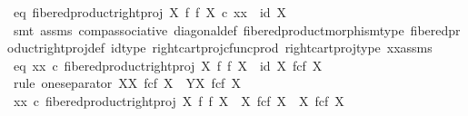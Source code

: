 \begin{isabellebody}
\ eq{}{\isacharcolon}{\kern0pt}\ {\isachardoublequoteopen}fibered{\isacharunderscore}{\kern0pt}product{\isacharunderscore}{\kern0pt}right{\isacharunderscore}{\kern0pt}proj\ X\ f\ f\ X\ {\isasymcirc}\isactrlsub c\ xx\ {\isacharequal}{\kern0pt}\ id\ X{\isachardoublequoteclose}\isanewline
\ \ \ \ \isamarkupfalse%
\ {\isacharparenleft}{\kern0pt}smt\ assms{\isacharparenleft}{\kern0pt}{}{\isacharparenright}{\kern0pt}\ comp{\isacharunderscore}{\kern0pt}associative{}\ diagonal{\isacharunderscore}{\kern0pt}def\ fibered{\isacharunderscore}{\kern0pt}product{\isacharunderscore}{\kern0pt}morphism{\isacharunderscore}{\kern0pt}type\ fibered{\isacharunderscore}{\kern0pt}product{\isacharunderscore}{\kern0pt}right{\isacharunderscore}{\kern0pt}proj{\isacharunderscore}{\kern0pt}def\ id{\isacharunderscore}{\kern0pt}type\ right{\isacharunderscore}{\kern0pt}cart{\isacharunderscore}{\kern0pt}proj{\isacharunderscore}{\kern0pt}cfunc{\isacharunderscore}{\kern0pt}prod\ right{\isacharunderscore}{\kern0pt}cart{\isacharunderscore}{\kern0pt}proj{\isacharunderscore}{\kern0pt}type\ xx{\isacharunderscore}{\kern0pt}assms{\isacharparenright}{\kern0pt}\isanewline
\isanewline
\ \ \isamarkupfalse%
\ eq{}{\isacharcolon}{\kern0pt}\ {\isachardoublequoteopen}xx\ {\isasymcirc}\isactrlsub c\ fibered{\isacharunderscore}{\kern0pt}product{\isacharunderscore}{\kern0pt}right{\isacharunderscore}{\kern0pt}proj\ X\ f\ f\ X\ {\isacharequal}{\kern0pt}\ id\ {\isacharparenleft}{\kern0pt}X\ \isactrlbsub f\isactrlesub {\isasymtimes}\isactrlsub c\isactrlbsub f\isactrlesub \ X{\isacharparenright}{\kern0pt}{\isachardoublequoteclose}\isanewline
\ \ \isamarkupfalse%
\ {\isacharparenleft}{\kern0pt}rule\ one{\isacharunderscore}{\kern0pt}separator{\isacharbrackleft}{\kern0pt}\ X{\isacharequal}{\kern0pt}{\isachardoublequoteopen}X\ \isactrlbsub f\isactrlesub {\isasymtimes}\isactrlsub c\isactrlbsub f\isactrlesub \ X{\isachardoublequoteclose}{\isacharcomma}{\kern0pt}\ \ Y{\isacharequal}{\kern0pt}{\isachardoublequoteopen}X\ \isactrlbsub f\isactrlesub {\isasymtimes}\isactrlsub c\isactrlbsub f\isactrlesub \ X{\isachardoublequoteclose}{\isacharbrackright}{\kern0pt}{\isacharparenright}{\kern0pt}\isanewline
\ \ \ \ \isamarkupfalse%
\ {\isachardoublequoteopen}xx\ {\isasymcirc}\isactrlsub c\ fibered{\isacharunderscore}{\kern0pt}product{\isacharunderscore}{\kern0pt}right{\isacharunderscore}{\kern0pt}proj\ X\ f\ f\ X\ {\isacharcolon}{\kern0pt}\ X\ \isactrlbsub f\isactrlesub {\isasymtimes}\isactrlsub c\isactrlbsub f\isactrlesub \ X\ {\isasymrightarrow}\ X\ \isactrlbsub f\isactrlesub {\isasymtimes}\isactrlsub c\isactrlbsub f\isactrlesub \ X{\isachardoublequoteclose}\isanewline

\end{isabellebody}
